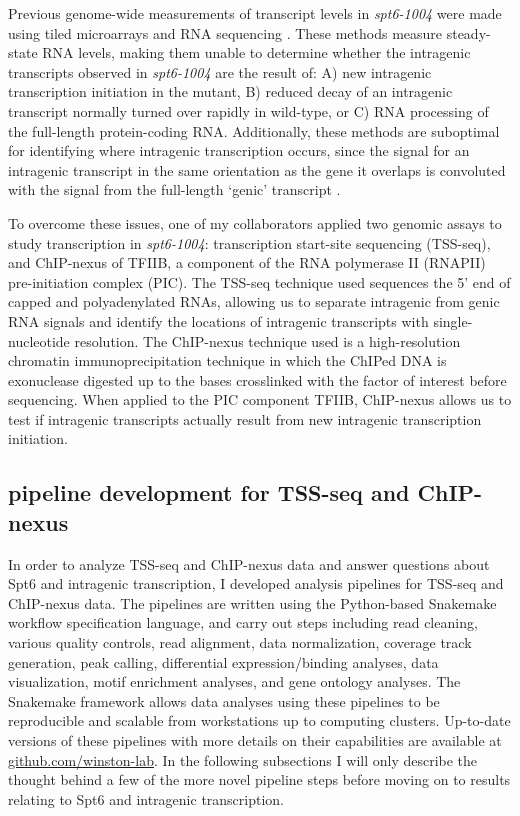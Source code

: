\documentclass[11pt, letterpaper]{article}
\begin{document}
Previous genome-wide measurements of transcript levels in \textit{spt6-1004} were made using tiled microarrays \cite{cheung2008} and RNA sequencing \cite{uwimana2017}. These methods measure steady-state RNA levels, making them unable to determine whether the intragenic transcripts observed in \textit{spt6-1004} are the result of: A) new intragenic transcription initiation in the mutant, B) reduced decay of an intragenic transcript normally turned over rapidly in wild-type, or C) RNA processing of the full-length protein-coding RNA. Additionally, these methods are suboptimal for identifying where intragenic transcription occurs, since the signal for an intragenic transcript in the same orientation as the gene it overlaps is convoluted with the signal from the full-length `genic' transcript \cite{cheung2008, lickwar2009}.

To overcome these issues, one of my collaborators applied two genomic assays to study transcription in \textit{spt6-1004}: transcription start-site sequencing (TSS-seq), and ChIP-nexus of TFIIB, a component of the RNA polymerase II (RNAPII) pre-initiation complex (PIC). The TSS-seq technique used sequences the 5' end of capped and polyadenylated RNAs, allowing us to separate intragenic from genic RNA signals and identify the locations of intragenic transcripts with single-nucleotide resolution. The ChIP-nexus technique used is a high-resolution chromatin immunoprecipitation technique in which the ChIPed DNA is exonuclease digested up to the bases crosslinked with the factor of interest before sequencing. When applied to the PIC component TFIIB, ChIP-nexus allows us to test if intragenic transcripts actually result from new intragenic transcription initiation.

\subsection{pipeline development for TSS-seq and ChIP-nexus}

In order to analyze TSS-seq and ChIP-nexus data and answer questions about Spt6 and intragenic transcription, I developed analysis pipelines for TSS-seq and ChIP-nexus data. The pipelines are written using the Python-based Snakemake workflow specification language, and carry out steps including read cleaning, various quality controls, read alignment, data normalization, coverage track generation, peak calling, differential expression/binding analyses, data visualization, motif enrichment analyses, and gene ontology analyses. The Snakemake framework allows data analyses using these pipelines to be reproducible and scalable from workstations up to computing clusters. Up-to-date versions of these pipelines with more details on their capabilities are available at \href{https://github.com/winston-lab}{github.com/winston-lab}. In the following subsections I will only describe the thought behind a few of the more novel pipeline steps before moving on to results relating to Spt6 and intragenic transcription.
\end{document}

